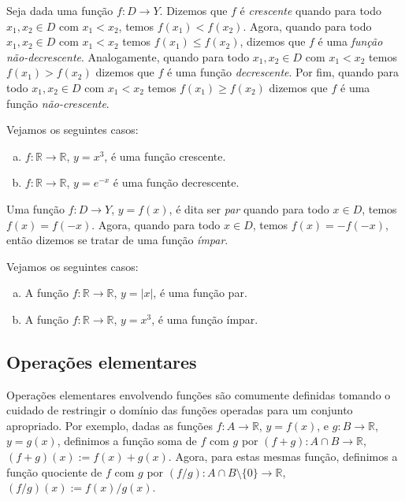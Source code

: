 \begin{defn}
  Seja dada uma função $f:D\to Y$. Dizemos que $f$ é \emph{crescente} quando para todo $x_1, x_2\in D$ com $x_1 < x_2$, temos $f(x_1) < f(x_2)$. Agora, quando para todo $x_1, x_2 \in D$ com $x_1 < x_2$ temos $f(x_1) \leq f(x_2)$, dizemos que $f$ é uma \emph{função não-decrescente}. Analogamente, quando para todo $x_1, x_2 \in D$ com $x_1 < x_2$ temos $f(x_1) > f(x_2)$ dizemos que $f$ é uma função \emph{decrescente}. Por fim, quando para todo $x_1, x_2 \in D$ com $x_1 < x_2$ temos $f(x_1) \geq f(x_2)$ dizemos que $f$ é uma função \emph{não-crescente}.
\end{defn}

\begin{ex}
  Vejamos os seguintes casos:
  \begin{enumerate}[a)]
  \item $f:\mathbb{R}\to\mathbb{R}$, $y = x^3$, é uma função crescente.
  \item $f:\mathbb{R}\to\mathbb{R}$, $y = e^{-x}$ é uma função decrescente.
  \end{enumerate}
\end{ex}

\begin{defn}
  Uma função $f:D\to Y$, $y = f(x)$, é dita ser \emph{par} quando para todo $x\in D$, temos $f(x) = f(-x)$. Agora, quando para todo $x\in D$, temos $f(x) = -f(-x)$, então dizemos se tratar de uma função \emph{ímpar}.
\end{defn}

\begin{ex}
  Vejamos os seguintes casos:
  \begin{enumerate}[a)]
  \item A função $f:\mathbb{R}\to\mathbb{R}$, $y=|x|$, é uma função par.
  \item A função $f:\mathbb{R}\to\mathbb{R}$, $y=x^3$, é uma função ímpar.
  \end{enumerate}
\end{ex}

\subsection{Operações elementares}

Operações elementares envolvendo funções são comumente definidas tomando o cuidado de restringir o domínio das funções operadas para um conjunto apropriado. Por exemplo, dadas as funções $f:A\to \mathbb{R}$, $y=f(x)$, e $g:B\to\mathbb{R}$, $y=g(x)$, definimos a função soma de $f$ com $g$ por $(f+g):A\cap B\to\mathbb{R}$, $(f+g)(x) := f(x) + g(x)$. Agora, para estas mesmas função, definimos a função quociente de $f$ com $g$ por $(f/g):A\cap B\setminus \{0\}\to\mathbb{R}$, $(f/g)(x) := f(x)/g(x)$.

